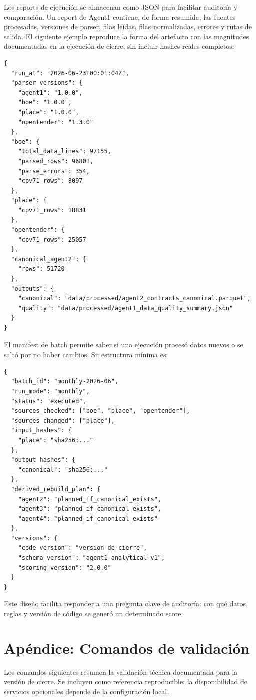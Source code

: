 \documentclass[11pt,a4paper,spanish]{book}
\numberwithin{equation}{chapter}
\numberwithin{figure}{chapter}
\begin{document}
Los reports de ejecuci{\'o}n se almacenan como JSON para facilitar auditor{\'i}a y comparaci{\'o}n. Un
report de Agent1 contiene, de forma resumida, las fuentes procesadas, versiones de parser, filas
le{\'i}das, filas normalizadas, errores y rutas de salida. El siguiente ejemplo reproduce la forma
del artefacto con las magnitudes documentadas en la ejecuci{\'o}n de cierre, sin incluir hashes reales
completos:

\begin{lstlisting}
{
  "run_at": "2026-06-23T00:01:04Z",
  "parser_versions": {
    "agent1": "1.0.0",
    "boe": "1.0.0",
    "place": "1.0.0",
    "opentender": "1.3.0"
  },
  "boe": {
    "total_data_lines": 97155,
    "parsed_rows": 96801,
    "parse_errors": 354,
    "cpv71_rows": 8097
  },
  "place": {
    "cpv71_rows": 18831
  },
  "opentender": {
    "cpv71_rows": 25057
  },
  "canonical_agent2": {
    "rows": 51720
  },
  "outputs": {
    "canonical": "data/processed/agent2_contracts_canonical.parquet",
    "quality": "data/processed/agent1_data_quality_summary.json"
  }
}
\end{lstlisting}

El manifest de batch permite saber si una ejecuci{\'o}n proces{\'o} datos nuevos o se salt{\'o} por no
haber cambios. Su estructura m{\'i}nima es:

\begin{lstlisting}
{
  "batch_id": "monthly-2026-06",
  "run_mode": "monthly",
  "status": "executed",
  "sources_checked": ["boe", "place", "opentender"],
  "sources_changed": ["place"],
  "input_hashes": {
    "place": "sha256:..."
  },
  "output_hashes": {
    "canonical": "sha256:..."
  },
  "derived_rebuild_plan": {
    "agent2": "planned_if_canonical_exists",
    "agent3": "planned_if_canonical_exists",
    "agent4": "planned_if_canonical_exists"
  },
  "versions": {
    "code_version": "version-de-cierre",
    "schema_version": "agent1-analytical-v1",
    "scoring_version": "2.0.0"
  }
}
\end{lstlisting}

Este dise{\~n}o facilita responder a una pregunta clave de auditor{\'i}a: con qu{\'e} datos, reglas y
versi{\'o}n de c{\'o}digo se gener{\'o} un determinado score.

\chapter{Ap{\'e}ndice: Comandos de validaci{\'o}n}
\label{ap:comandos_validacion}

Los comandos siguientes resumen la validaci{\'o}n t{\'e}cnica documentada para la versi{\'o}n de cierre.
Se incluyen como referencia reproducible; la disponibilidad de servicios opcionales depende de la
configuraci{\'o}n local.
\end{document}

